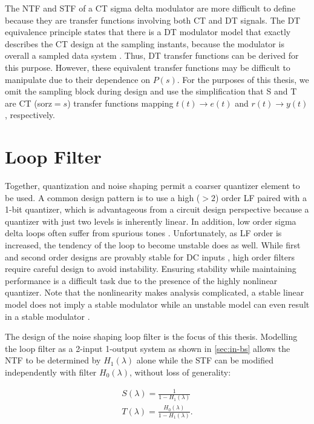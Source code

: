 The \gls{NTF} and \gls{STF} of a \gls{CT} sigma delta modulator are more difficult to define because they are transfer functions involving both \gls{CT} and \gls{DT} signals. The \gls{DT} equivalence principle states that there is a \gls{DT} modulator model that exactly describes the \gls{CT} design at the sampling instants, because the modulator is overall a sampled data system \cite[Sec. 3.2]{Ortmanns2005}. Thus, \gls{DT} transfer functions can be derived for this purpose. However, these equivalent transfer functions may be difficult to manipulate due to their dependence on $P(s)$. For the purposes of this thesis, we omit the sampling block during design and use the simplification that \gls{S} and \gls{T} are \gls{CT} (\gls{sorz}$=s$) transfer functions mapping $t(t) \rightarrow e(t)$ and $r(t) \rightarrow y(t)$, respectively.

\section{Loop Filter}
\label{sec:in-lf}

Together, quantization and noise shaping permit a coarser quantizer element to be used. A common design pattern is to use a high ($>2$) order \gls{LF} paired with a 1-bit quantizer, which is advantageous from a circuit design perspective because a quantizer with just two levels is inherently linear. In addition, low order sigma delta loops often suffer from spurious tones \cite[Sec. 2.6.1]{Schreier1997}. Unfortunately, as \gls{LF} order is increased, the tendency of the loop to become unstable does as well. While first and second order designs are provably stable for DC inputs \cite{Hein1993}, high order filters require careful design to avoid instability. Ensuring stability while maintaining performance is a difficult task due to the presence of the highly nonlinear quantizer. Note that the nonlinearity makes analysis complicated, a stable linear model does not imply a stable modulator while an unstable model can even result in a stable modulator \cite{Risbo1994}.

The design of the noise shaping loop filter is the focus of this thesis. Modelling the loop filter as a 2-input 1-output system as shown in \autoref{sec:in-bs} allows the \gls{NTF} to be determined by $H_1(\lambda)$ alone while the \gls{STF} can be modified independently with filter $H_0(\lambda)$, without loss of generality:

\begin{align}
	S(\lambda) = \frac{1}{1 - H_1(\lambda)} \\
	T(\lambda) = \frac{H_0(\lambda)}{1 - H_1(\lambda)}. \label{eq:t}
\end{align}

